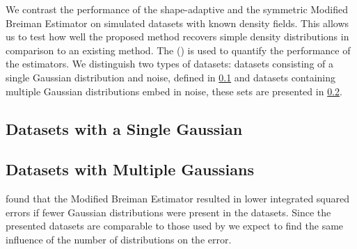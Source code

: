 We contrast the performance of the shape-adaptive and the symmetric Modified Breiman Estimator on simulated datasets with known density fields. This allows us to test how well the proposed method recovers simple density distributions in comparison to an existing method. The \mse (\MSE) is used to quantify the performance of the estimators. We distinguish two types of datasets: datasets consisting of a single Gaussian distribution and noise, defined in \cref{s:experiment:singlesphere} and datasets containing multiple Gaussian distributions embed in noise, these sets are presented in \cref{s:experiment:multisphere}.

\subsection{Datasets with a Single Gaussian}
\label{s:experiment:singlesphere}


\subsection{Datasets with Multiple Gaussians}
\label{s:experiment:multisphere}


\textcite{ferdosi2011comparison} found that the Modified Breiman Estimator resulted in lower integrated squared errors if fewer Gaussian distributions were present in the datasets. Since the presented datasets are comparable to those used by \citeauthor{ferdosi2011comparison} we expect to find the same influence of the number of distributions on the error.
